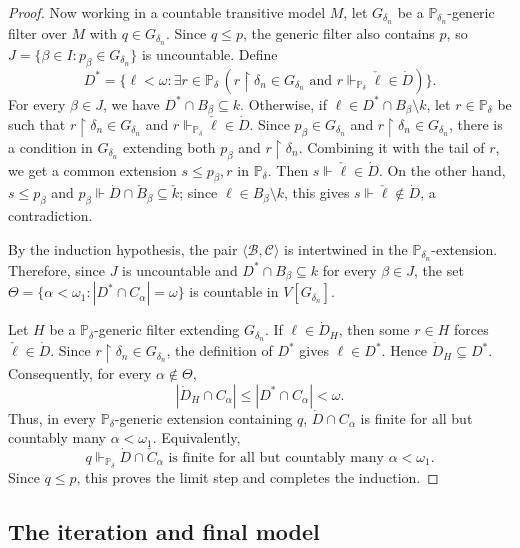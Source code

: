 \begin{proof}
Now working in a countable transitive model $M$, let $G_{\delta_n}$ be a $\mathbb P_{\delta_n}$-generic filter over $M$ with $q \in G_{\delta_n}$.
Since $q\leq p$, the generic filter also contains $p$, so $J=\{\beta\in I:p_\beta\in G_{\delta_n}\}$ is uncountable.
Define
\[
  D^*=\{\ell<\omega:
    \exists r\in\mathbb P_\delta\,
    (r\restriction\delta_n\in G_{\delta_n}
    \text{ and }
    r\Vdash_{\mathbb P_\delta}\check\ell\in\dot D)\}.
\]
For every $\beta\in J$, we have $D^*\cap B_\beta\subseteq k$.
Otherwise, if $\ell\in D^*\cap B_\beta\setminus k$, let $r \in \mathbb P_\delta$ be such that $r\restriction\delta_n\in G_{\delta_n}$ and $r\Vdash_{\mathbb P_\delta}\check\ell\in\dot D$.
Since $p_\beta\in G_{\delta_n}$ and $r\restriction\delta_n\in G_{\delta_n}$, there is a condition in $G_{\delta_n}$ extending both $p_\beta$ and $r\restriction\delta_n$.
Combining it with the tail of $r$, we get a common extension $s\leq p_\beta,r$ in $\mathbb P_\delta$.
Then $s\Vdash \check \ell\in\dot D$.
On the other hand, $s\leq p_\beta$ and $p_\beta\Vdash \dot D\cap\check B_\beta\subseteq\check k$; since $\ell\in B_\beta\setminus k$, this gives $s\Vdash \check \ell\notin\dot D$, a contradiction.

By the induction hypothesis, the pair
$\langle\mathcal B,\mathcal C\rangle$ is intertwined in the
$\mathbb P_{\delta_n}$-extension.  Therefore, since $J$ is uncountable and
$D^*\cap B_\beta\subseteq k$ for every $\beta\in J$, the set $\Theta=\{\alpha<\omega_1:|D^*\cap C_\alpha|=\omega\}$
is countable in $V[G_{\delta_n}]$.

Let $H$ be a $\mathbb P_\delta$-generic
filter extending $G_{\delta_n}$.
If $\ell\in\dot D_H$, then some $r\in H$ forces
$\check\ell\in\dot D$.  Since $r\restriction\delta_n\in G_{\delta_n}$, the
definition of $D^*$ gives $\ell\in D^*$.  Hence $\dot D_H\subseteq D^*$.
Consequently, for every $\alpha\notin\Theta$,
\[
  |\dot D_H\cap C_\alpha|
  \leq |D^*\cap C_\alpha|
  <\omega.
\]
Thus, in every $\mathbb P_\delta$-generic extension containing $q$,
$\dot D\cap C_\alpha$ is finite for all but countably many $\alpha<\omega_1$.
Equivalently,
\[
  q\Vdash_{\mathbb P_\delta}
  \dot D\cap \check C_\alpha\text{ is finite for all but countably many }
  \alpha<\omega_1.
\]
Since $q\leq p$, this proves the limit step and completes the induction.
\end{proof}

\subsection{The iteration and final model}

